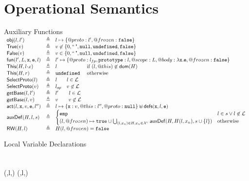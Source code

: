 \documentclass[a4paper,notitlepage]{report}
\begin{document}
\chapter{Operational Semantics}
\label{app:opsems}
\newcommand{\auxf}[2]{#1 & \triangleq & #2}
\begin{display}{Auxiliary Functions}
  $\begin{array}{lcl}
  \auxf{\obj(l,l')}{l \pointsto \{@proto: l', @frozen: \false\}}\\
  \auxf{\istrue(v)}{v\not\in\{0,\emptystr,\nil,\und,\false\}}\\
  \auxf{\isfalse(v)}{v\in   \{0,\emptystr,\nil,\und,\false\}}\\
  \auxf{\fun(l',L,\js x,\js e,l)}{l'\mapsto\{@proto: \lfp, \js{prototype}:
        l, @scope: L, @body: \lambda \js{x.e}, @frozen: \false\}}\\
  \auxf{\pickThis(H, \fld{l}{x})}{l \phantom{\und} \quad
        \text{if } (l,@this) \not\in \dom(H)}\\
  \auxf{\pickThis(H, r)}{\und \phantom{l} \quad \text{otherwise}}\\
  \auxf{\objOrGlob(l)}{l\phantom{_{op}} \quad l\in \loc}\\
  \auxf{\objOrGlob(v)}{\lop \quad v\not\in\loc}\\
  \auxf{\getBase(l,l')}{l' \qquad l \in \loc}\\
  \auxf{\getBase(l,v)}{v \qquad v\not\in\loc}\\

  \auxf{\act(l,\js{x},v,\js{e},l'')}{l\pointsto\{\js{x}:
    v,@this: l'',@proto: \nil\}\disju \defs(\js{x},l,\js{e})}\\

  \auxf{\auxDef(H,l,s)}{\begin{cases}
      \emp & l \in s \lor l \not\in \loc\\
      (l,@frozen) \mapsto \true \cup \bigcup_{(l,x_n) \in H, x_n \in \uvars}
      \auxDef(H,H(l,x_n),s \cup\{l\}) & \mbox{otherwise} \\
    \end{cases}}\\
  \auxf{\ReadWrite(H, l)}{H(l, @frozen) = \false} \\
  \end{array}$
\end{display}
  \begin{display}{Local Variable Declarations}
     \\
     \\
     \\
      {(,l,) \cup {}(,l,)} \\
     \\
  \end{display}
\end{document}
